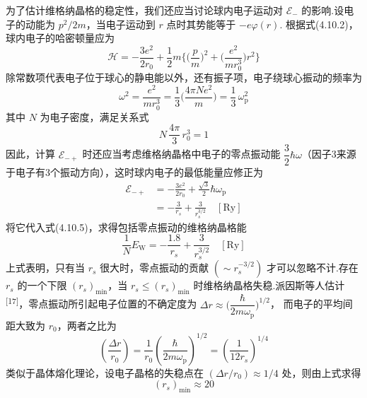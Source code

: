 为了估计维格纳晶格的稳定性，我们还应当讨论球内电子运动对 $\mathcal{E}_{-}$ 的影响.设电子的动能为 $p^{2}/2m$，当电子运动到 $r$ 点时其势能等于 $-e\varphi(r)$. 根据式(4.10.2)，球内电子的哈密顿量应为
\begin{equation}
  \mathcal{H}=-\frac{3e^{2}}{2r_{0}}
  +\frac{1}{2}m\bigg\{\bigg(\frac{p}{m}\bigg)^{2}
  +\bigg(\frac{e^{2}}{mr_{0}^{3}}\bigg)r^{2}\bigg\}
\end{equation}
除常数项代表电子位于球心的静电能以外，还有振子项，电子绕球心振动的频率为
\begin{equation}
  \omega^{2}=\frac{e^{2}}{mr_{0}^{3}}
  =\frac{1}{3}\bigg(\frac{4\pi Ne^{2}}{m}\bigg)
  =\frac{1}{3}\,\omega_{\mathrm{p}}^{2}
\end{equation}
其中 $N$ 为电子密度，满足关系式
\begin{equation}
  N\,\frac{4\pi}{3}\,r_{0}^{3}=1
\end{equation}
因此，计算 $\mathcal{E}_{-+}$ 时还应当考虑维格纳晶格中电子的零点振动能 $\dfrac{3}{2}\hbar\omega$（因子3来源于电子有3个振动方向），这时球内电子的最低能量应修正为
\begin{equation}
\begin{aligned}
  \mathcal{E}_{-+}
  &=-\frac{3e^{2}}{2r_{0}}+\frac{\sqrt{3}}{2}\hbar\omega_{\mathrm{p}}\\
  &=-\frac{3}{r_{s}}+\frac{3}{r_{s}^{3/2}}\quad\left[\mathrm{Ry}\right]
\end{aligned}
\end{equation}
将它代入式(4.10.5)，求得包括零点振动的维格纳晶格能
\begin{equation}
  \frac{1}{N}E_{\mathrm{W}}=-\frac{1.8}{r_{s}}
  +\frac{3}{r_{s}^{3/2}}\quad\left[\mathrm{Ry}\right]
\end{equation}
上式表明，只有当 $r_{s}$ 很大时，零点振动的贡献 $\left(\sim r_{s}^{-3/2}\right)$ 才可以忽略不计.存在 $r_{s}$ 的一个下限 $\left(r_{s}\right)_{\min}$，当 $r_{s}\leqslant\left(r_{s}\right)_{\min}$ 时维格纳晶格失稳.派因斯等人估计\textsuperscript{[17]}，零点振动所引起电子位置的不确定度为
$\Delta r\approx\bigg(\dfrac{\hbar}{2m\omega_{\mathrm{p}}}\bigg)^{1/2}$，
而电子的平均间距大致为 $r_{0}$，两者之比为
\begin{equation}
  \left(\frac{\Delta r}{r_{0}}\right)=\frac{1}{r_{0}}
  \left(\frac{\hbar}{2m\omega_{\mathrm{p}}}\right)^{1/2}
  =\left(\frac{1}{12r_{s}}\right)^{1/4}
\end{equation}
类似于晶体熔化理论，设电子晶格的失稳点在 $\left(\Delta r/r_{0}\right)\approx 1/4$ 处，则由上式求得
\begin{equation}
  \left(r_{s}\right)_{\min}\approx 20
\end{equation}
